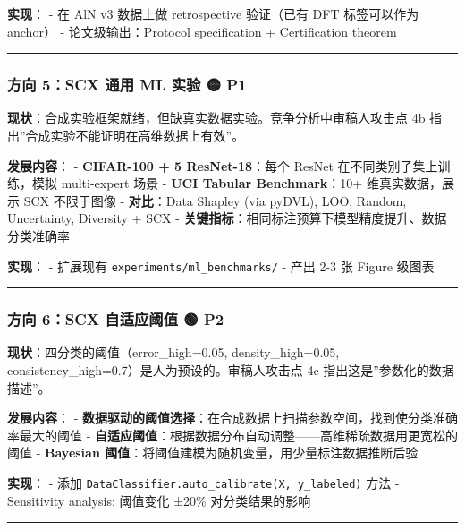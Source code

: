 \documentclass[
  12pt,
]{ctexart}
\begin{document}
\textbf{实现}： - 在 AlN v3 数据上做 retrospective 验证（已有 DFT
标签可以作为 anchor） - 论文级输出：Protocol specification +
Certification theorem

\begin{center}\rule{0.5\linewidth}{0.5pt}\end{center}

\subsubsection{方向 5：SCX 通用 ML 实验 🟡
P1}\label{ux65b9ux5411-5scx-ux901aux7528-ml-ux5b9eux9a8c-p1}

\textbf{现状}：合成实验框架就绪，但缺真实数据实验。竞争分析中审稿人攻击点
4b 指出''合成实验不能证明在高维数据上有效''。

\textbf{发展内容}： - \textbf{CIFAR-100 + 5 ResNet-18}：每个 ResNet
在不同类别子集上训练，模拟 multi-expert 场景 - \textbf{UCI Tabular
Benchmark}：10+ 维真实数据，展示 SCX 不限于图像 - \textbf{对比}：Data
Shapley (via pyDVL), LOO, Random, Uncertainty, Diversity + SCX -
\textbf{关键指标}：相同标注预算下模型精度提升、数据分类准确率

\textbf{实现}： - 扩展现有 \texttt{experiments/ml\_benchmarks/} - 产出
2-3 张 Figure 级图表

\begin{center}\rule{0.5\linewidth}{0.5pt}\end{center}

\subsubsection{方向 6：SCX 自适应阈值 🟢
P2}\label{ux65b9ux5411-6scx-ux81eaux9002ux5e94ux9608ux503c-p2}

\textbf{现状}：四分类的阈值（error\_high=0.05, density\_high=0.05,
consistency\_high=0.7）是人为预设的。审稿人攻击点 4c
指出这是''参数化的数据描述''。

\textbf{发展内容}： -
\textbf{数据驱动的阈值选择}：在合成数据上扫描参数空间，找到使分类准确率最大的阈值
-
\textbf{自适应阈值}：根据数据分布自动调整------高维稀疏数据用更宽松的阈值
- \textbf{Bayesian 阈值}：将阈值建模为随机变量，用少量标注数据推断后验

\textbf{实现}： - 添加
\texttt{DataClassifier.auto\_calibrate(X,\ y\_labeled)} 方法 -
Sensitivity analysis: 阈值变化 ±20\% 对分类结果的影响

\begin{center}\rule{0.5\linewidth}{0.5pt}\end{center}
\end{document}
